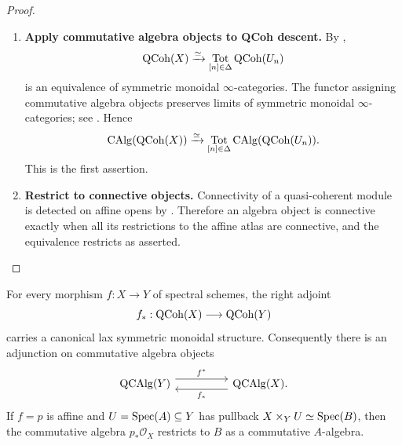 \begin{proof}
\leavevmode
\begin{enumerate}[label=\textup{(\arabic*)}]
    \item \textbf{Apply commutative algebra objects to QCoh descent.}
    By ,
    \[
        \operatorname{QCoh}(X)
        \xrightarrow{\simeq}
        \operatorname*{Tot}_{[n]\in\Delta}\operatorname{QCoh}(U_n)
    \]
    is an equivalence of symmetric monoidal \(\infty\)-categories. The
    functor assigning commutative algebra objects preserves limits of
    symmetric monoidal \(\infty\)-categories; see
    \cite{LurieHigherAlgebra}. Hence
    \[
        \operatorname{CAlg}(\operatorname{QCoh}(X))
        \xrightarrow{\simeq}
        \operatorname*{Tot}_{[n]\in\Delta}
        \operatorname{CAlg}(\operatorname{QCoh}(U_n)).
    \]
    This is the first assertion.

    \item \textbf{Restrict to connective objects.}
    Connectivity of a quasi-coherent module is detected on affine opens by
    . Therefore an algebra object
    is connective exactly when all its restrictions to the affine atlas are
    connective, and the equivalence restricts as asserted.
\end{enumerate}
\end{proof}

\begin{proposition}
\label{prop:qcoh-direct-image-lax-monoidal}
For every morphism \(f:X\to Y\) of spectral schemes, the right adjoint
\[
    f_*:\operatorname{QCoh}(X)\longrightarrow\operatorname{QCoh}(Y)
\]
carries a canonical lax symmetric monoidal structure. Consequently there is
an adjunction on commutative algebra objects
\[
\begin{tikzcd}[column sep=huge]
    \operatorname{QCAlg}(Y)
        \arrow[r, shift left=1.1ex, "f^*"]
    &
    \operatorname{QCAlg}(X)
        \arrow[l, swap, shift left=1.1ex, "f_*"'].
\end{tikzcd}
\]
If \(f=p\) is affine and \(U=\operatorname{Spec}(A)\subseteq Y\) has pullback
\(X\times_YU\simeq\operatorname{Spec}(B)\), then the commutative algebra
\(p_*\mathcal O_X\) restricts to \(B\) as a commutative \(A\)-algebra.
\end{proposition}

